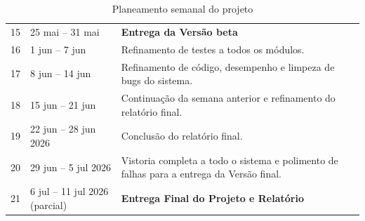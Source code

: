 \begin{table}[H]
\begin{tabular}{|c|l|p{11.0cm}|}
            15 & 25 mai -- 31 mai & \textbf{Entrega da Versão beta} \\
            16 & 1 jun -- 7 jun & Refinamento de testes a todos os módulos. \\
            17 & 8 jun -- 14 jun & Refinamento de código, desempenho e limpeza de bugs do sistema. \\
            18 & 15 jun -- 21 jun & Continuação da semana anterior e refinamento do relatório final. \\
            19 & 22 jun -- 28 jun 2026 & Conclusão do relatório final. \\
            20 & 29 jun -- 5 jul 2026 & Vistoria completa a todo o sistema e polimento de falhas para a entrega da Versão final. \\
            21 & 6 jul -- 11 jul 2026 (parcial) & \textbf{Entrega Final do Projeto e Relatório} \\
            \hline
        \end{tabular}
        \caption{Planeamento semanal do projeto}
    \end{table}



